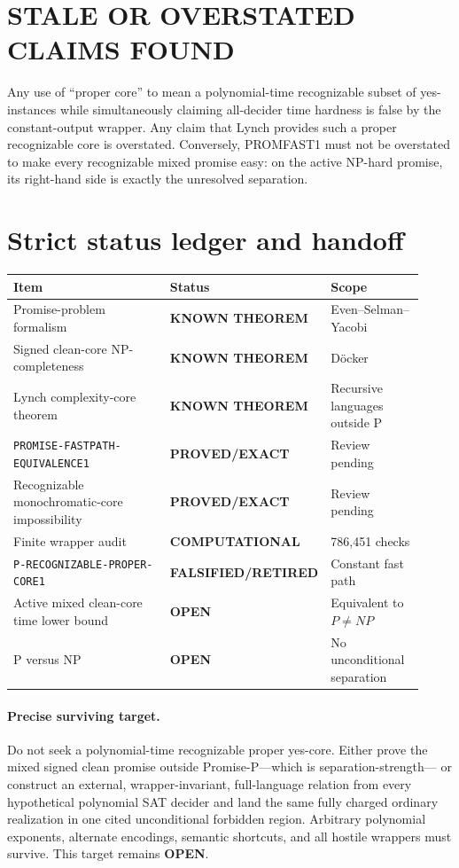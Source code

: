 \documentclass[11pt]{article}
\newcommand{\OPEN}{\textbf{OPEN}}
\newcommand{\EXACT}{\textbf{PROVED/EXACT}}
\newcommand{\KNOWN}{\textbf{KNOWN THEOREM}}
\newcommand{\COMP}{\textbf{COMPUTATIONAL}}
\newcommand{\RETIRED}{\textbf{FALSIFIED/RETIRED}}
\begin{document}
\section{STALE OR OVERSTATED CLAIMS FOUND}
Any use of ``proper core'' to mean a polynomial-time recognizable subset of
yes-instances while simultaneously claiming all-decider time hardness is
false by the constant-output wrapper.  Any claim that Lynch provides such a
proper recognizable core is overstated.  Conversely, PROMFAST1 must not be
overstated to make every recognizable mixed promise easy: on the active
NP-hard promise, its right-hand side is exactly the unresolved separation.

\section{Strict status ledger and handoff}
\begin{center}
\begin{tabular}{p{0.48\linewidth}p{0.20\linewidth}p{0.24\linewidth}}
\toprule
Item & Status & Scope \\
\midrule
Promise-problem formalism & \KNOWN & Even--Selman--Yacobi\\
Signed clean-core NP-completeness & \KNOWN & D\"ocker\\
Lynch complexity-core theorem & \KNOWN & Recursive languages outside P\\
\texttt{PROMISE-FASTPATH-EQUIVALENCE1} & \EXACT & Review pending\\
Recognizable monochromatic-core impossibility & \EXACT & Review pending\\
Finite wrapper audit & \COMP & 786,451 checks\\
\texttt{P-RECOGNIZABLE-PROPER-CORE1} & \RETIRED & Constant fast path\\
Active mixed clean-core time lower bound & \OPEN & Equivalent to $P\ne NP$\\
P versus NP & \OPEN & No unconditional separation\\
\bottomrule
\end{tabular}
\end{center}

\paragraph{Precise surviving target.}
Do not seek a polynomial-time recognizable proper yes-core.  Either prove the
mixed signed clean promise outside Promise-P---which is separation-strength---
or construct an external, wrapper-invariant, full-language relation from every
hypothetical polynomial SAT decider and land the same fully charged ordinary
realization in one cited unconditional forbidden region.  Arbitrary polynomial
exponents, alternate encodings, semantic shortcuts, and all hostile wrappers
must survive.  This target remains \OPEN.
\end{document}
